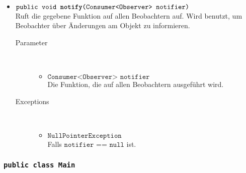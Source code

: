 \begin{description}
\begin{itemize}
		\item $\texttt{public void \textbf{notify}(Consumer<Observer> notifier)}$ \\ Ruft die gegebene Funktion auf allen Beobachtern auf. Wird benutzt, um Beobachter über Änderungen am Objekt zu informieren.
		\begin{description}
			\item[Parameter] \hfill \\
			\vspace{-.8cm}
			\begin{itemize}
				\item $\texttt{Consumer<Observer> notifier}$ \\ Die Funktion, die auf allen Beobachtern ausgeführt wird.
			\end{itemize}
			\item[Exceptions] \hfill \\
			\vspace{-.8cm}
			\begin{itemize}
				\item $\texttt{NullPointerException}$ \\ Falls $\texttt{notifier == null}$ ist.
			\end{itemize}
		\end{description}
	\end{itemize}
\end{description}

\subsubsection{\normalfont \texttt{public class \textbf{Main}}}

